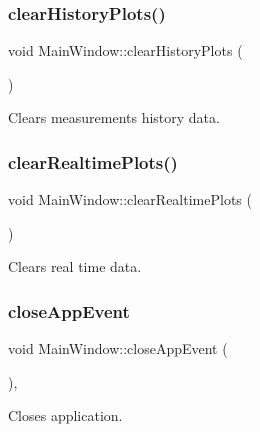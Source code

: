\subsubsection{\texorpdfstring{clear\+History\+Plots()}{clearHistoryPlots()}}
{\footnotesize\ttfamily void Main\+Window\+::clear\+History\+Plots (\begin{DoxyParamCaption}{ }\end{DoxyParamCaption})\hspace{0.3cm}{\ttfamily [private]}}



Clears measurements history data. 

\mbox{\label{class_main_window_ae9a461c9fd369552f0e8871ec8f8f191}} 
\subsubsection{\texorpdfstring{clear\+Realtime\+Plots()}{clearRealtimePlots()}}
{\footnotesize\ttfamily void Main\+Window\+::clear\+Realtime\+Plots (\begin{DoxyParamCaption}{ }\end{DoxyParamCaption})\hspace{0.3cm}{\ttfamily [private]}}



Clears real time data. 

\mbox{\label{class_main_window_aa23e4e2f222120878dc47b594292bb8c}} 
\subsubsection{\texorpdfstring{close\+App\+Event}{closeAppEvent}}
{\footnotesize\ttfamily void Main\+Window\+::close\+App\+Event (\begin{DoxyParamCaption}{ }\end{DoxyParamCaption})\hspace{0.3cm}{\ttfamily [private]}, {\ttfamily [slot]}}



Closes application. 

\mbox{\label{class_main_window_a92ea4484e5fd9b2d41fe08d2aef4c459}} 
